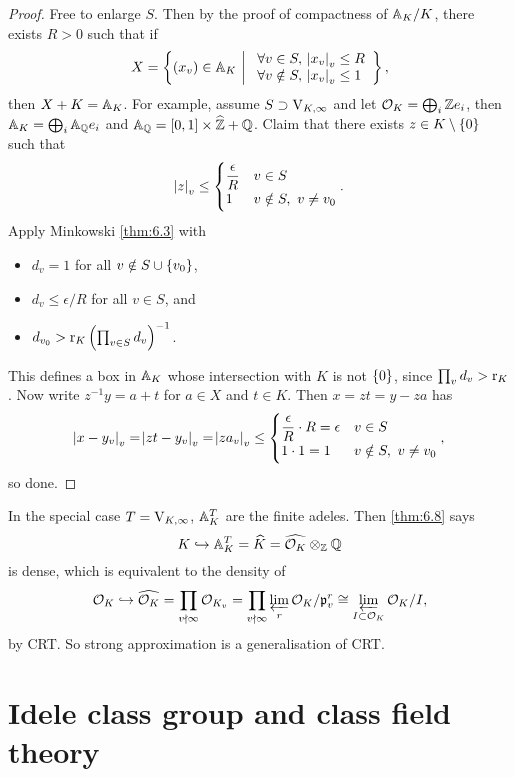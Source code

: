 \begin{proof}
Free to enlarge $ S $. Then by the proof of compactness of $ \AA_K / K $, there exists $ R > 0 $ such that if
$$ X = \cbr{\br{x_v} \in \AA_K \st \begin{array}{l} \forall v \in S, \ \abs{x_v}_v \le R \\ \forall v \notin S, \ \abs{x_v}_v \le 1 \end{array}}, $$
then $ X + K = \AA_K $. For example, assume $ S \supset \V_{K, \infty} $ and let $ \OOO_K = \bigoplus_i \ZZ e_i $, then $ \AA_K = \bigoplus_i \AA_\QQ e_i $ and $ \AA_\QQ = \sbr{0, 1} \times \widehat{\ZZ} + \QQ $. Claim that there exists $ z \in K \setminus \cbr{0} $ such that
$$ \abs{z}_v \le
\begin{cases}
\dfrac{\epsilon}{R} & v \in S \\
1 & v \notin S, \ v \ne v_0
\end{cases}.
$$
Apply Minkowski \ref{thm:6.3} with
\begin{itemize}
\item $ d_v = 1 $ for all $ v \notin S \cup \cbr{v_0} $,
\item $ d_v \le \epsilon / R $ for all $ v \in S $, and
\item $ d_{v_0} > \r_K\br{\prod_{v \in S} d_v}^{-1} $.
\end{itemize}
This defines a box in $ \AA_K $ whose intersection with $ K $ is not $ \cbr{0} $, since $ \prod_v d_v > \r_K $. Now write $ z^{-1}y = a + t $ for $ a \in X $ and $ t \in K $. Then $ x = zt = y - za $ has
$$ \abs{x - y_v}_v = \abs{zt - y_v}_v = \abs{za_v}_v \le
\begin{cases}
\dfrac{\epsilon}{R} \cdot R = \epsilon & v \in S \\
1 \cdot 1 = 1 & v \notin S, \ v \ne v_0
\end{cases},
$$
so done.
\end{proof}

In the special case $ T = \V_{K, \infty} $, $ \AA_K^T $ are the finite adeles. Then \ref{thm:6.8} says
$$ K \hookrightarrow \AA_K^T = \widehat{K} = \widehat{\OOO_K} \otimes_\ZZ \QQ $$
is dense, which is equivalent to the density of
$$ \OOO_K \hookrightarrow \widehat{\OOO_K} = \prod_{v \nmid \infty} \OOO_{K_v} = \prod_{v \nmid \infty} \varprojlim_r \OOO_K / \ppp_v^r \cong \varprojlim_{I \subset \OOO_K} \OOO_K / I, $$
by CRT. So strong approximation is a generalisation of CRT.

\pagebreak

\section{Idele class group and class field theory}

